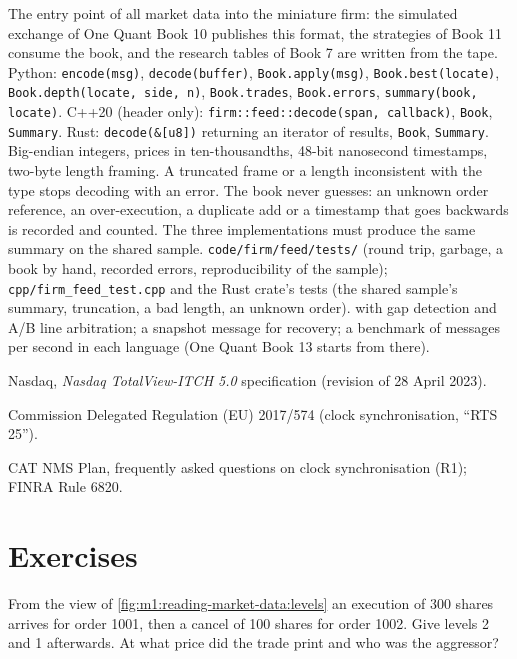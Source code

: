 \begin{build}
 The entry point of all market data into the miniature
firm: the simulated exchange of One Quant Book 10 publishes this format, the
strategies of Book 11 consume the book, and the research tables of Book 7 are
written from the tape.
 Python: \texttt{encode(msg)}, \texttt{decode(buffer)},
\texttt{Book.apply(msg)}, \texttt{Book.best(locate)}, \texttt{Book.depth(locate,
side, n)}, \texttt{Book.trades}, \texttt{Book.errors}, \texttt{summary(book,
locate)}. C++20 (header only): \texttt{firm::feed::decode(span, callback)},
\texttt{Book}, \texttt{Summary}. Rust: \texttt{decode(\&[u8])} returning an
iterator of results, \texttt{Book}, \texttt{Summary}.
 Big-endian integers, prices in ten-thousandths, 48-bit
nanosecond timestamps, two-byte length framing. A truncated frame or a
length inconsistent with the type stops decoding with an error. The book
never guesses: an unknown order reference, an over-execution, a duplicate
add or a timestamp that goes backwards is recorded and counted. The three
implementations must produce the same summary on the shared sample.
 \texttt{code/firm/feed/tests/} (round trip, garbage,
a book by hand, recorded errors, reproducibility of the sample);
\texttt{cpp/firm\_feed\_test.cpp} and the Rust crate's tests (the shared
sample's summary, truncation, a bad length, an unknown order).
  with gap detection and A/B line
arbitration; a snapshot message for recovery; a benchmark of messages per
second in each language (One Quant Book 13 starts from there).
\end{build}

\begin{omsources}
\item Nasdaq, \emph{Nasdaq TotalView-ITCH 5.0} specification (revision of 28
April 2023).
\item Commission Delegated Regulation (EU) 2017/574 (clock synchronisation,
``RTS 25'').
\item CAT NMS Plan, frequently asked questions on clock synchronisation
(R1); FINRA Rule 6820.
\end{omsources}

\section{Exercises}

\begin{exercise}[$\star$]\label{exo:m1:reading-market-data:1}
From the  view of \cref{fig:m1:reading-market-data:levels} an execution
of 300 shares arrives for order 1001, then a cancel of 100 shares for order
1002. Give levels 2 and 1 afterwards. At what price did the trade print and
who was the aggressor?
\end{exercise}

